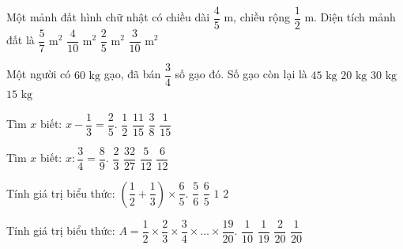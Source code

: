 \begin{ex} %
Một mảnh đất hình chữ nhật có chiều dài $\dfrac{4}{5}\text{ m}$, chiều rộng $\dfrac{1}{2}\text{ m}$. Diện tích mảnh đất là
\choice
{$\dfrac{5}{7}\text{ m}^2$}
{$\dfrac{4}{10}\text{ m}^2$}
{\True $\dfrac{2}{5}\text{ m}^2$}
{$\dfrac{3}{10}\text{ m}^2$}
\end{ex}

\begin{ex} %
Một người có $60\text{ kg}$ gạo, đã bán $\dfrac{3}{4}$ số gạo đó. Số gạo còn lại là
\choice
{$45\text{ kg}$}
{$20\text{ kg}$}
{$30\text{ kg}$}
{\True $15\text{ kg}$}
\end{ex}

\begin{ex} %
Tìm $x$ biết: $x - \dfrac{1}{3} = \dfrac{2}{5}$.
\choice
{$\dfrac{1}{2}$}
{\True $\dfrac{11}{15}$}
{$\dfrac{3}{8}$}
{$\dfrac{1}{15}$}
\end{ex}

\begin{ex} %
Tìm $x$ biết: $x : \dfrac{3}{4} = \dfrac{8}{9}$.
\choice
{\True $\dfrac{2}{3}$}
{$\dfrac{32}{27}$}
{$\dfrac{5}{12}$}
{$\dfrac{6}{12}$}
\end{ex}

\begin{ex} %
Tính giá trị biểu thức: $\left(\dfrac{1}{2} + \dfrac{1}{3}\right) \times \dfrac{6}{5}$.
\choice
{$\dfrac{5}{6}$}
{$\dfrac{6}{5}$}
{\True $1$}
{$2$}
\end{ex}

\begin{ex} %
Tính giá trị biểu thức: $A = \dfrac{1}{2} \times \dfrac{2}{3} \times \dfrac{3}{4} \times \dots \times \dfrac{19}{20}$.
\choice
{$\dfrac{1}{10}$}
{$\dfrac{1}{19}$}
{$\dfrac{2}{20}$}
{\True $\dfrac{1}{20}$}
\end{ex}

